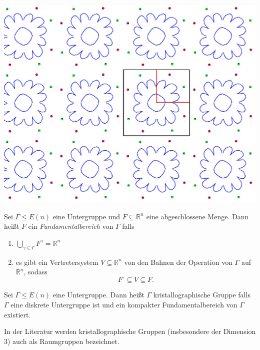 \documentclass{beamer}
\theoremstyle{plain}
\newcommand\R{\mathbb R}
\begin{document}
\begin{frame}
    \centering
    \includegraphics[width=\textwidth]{images/p4-animation/p4-full-trans.jpg}
\end{frame}

\begin{frame}
    \begin{definition}
        Sei $\Gamma \leq E(n)$ eine Untergruppe und $F \subseteq \R^n$ eine abgeschlossene Menge. Dann heißt $F$ ein \emph{Fundamentalbereich} von $\Gamma$ falls
        \begin{enumerate}[label=(\roman*)]
            \item $\bigcup_{\gamma \in \Gamma} F^\gamma = \R^n$\pause
            \item es gibt ein Vertretersystem $V \subseteq \R^n$ von den Bahnen der Operation von $\Gamma$ auf $\R^n$, sodass
                $$
                    F^\circ \subseteq V \subseteq F.
                $$
        \end{enumerate}
    \end{definition}

    \pause
    \begin{definition}
        Sei $\Gamma \leq E(n)$ eine Untergruppe. Dann heißt $\Gamma$ kristallographische Gruppe falls $\Gamma$ eine diskrete Untergruppe ist und ein kompakter Fundamentalbereich von $\Gamma$ existiert.
    \end{definition}
    In der Literatur werden kristallographische Gruppen (insbesondere der Dimension $3$) auch als Raumgruppen bezeichnet.
\end{frame}
\end{document}
